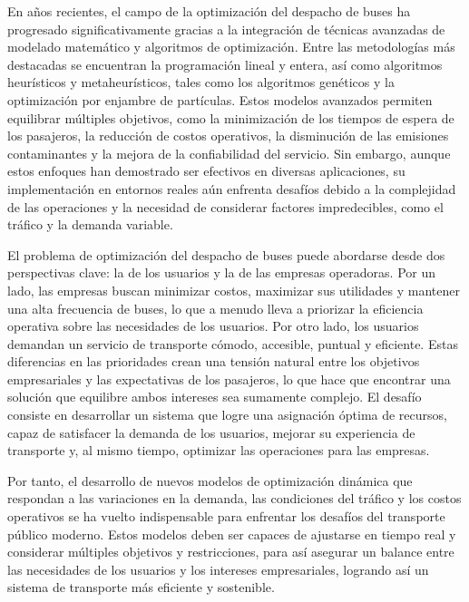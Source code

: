 \documentclass[preprint,11pt]{elsarticle}
\begin{document}
En años recientes, el campo de la optimización del despacho de buses ha progresado significativamente gracias a la integración de técnicas avanzadas de modelado matemático y algoritmos de optimización. Entre las metodologías más destacadas se encuentran la programación lineal y entera, así como algoritmos heurísticos y metaheurísticos, tales como los algoritmos genéticos y la optimización por enjambre de partículas. Estos modelos avanzados permiten equilibrar múltiples objetivos, como la minimización de los tiempos de espera de los pasajeros, la reducción de costos operativos, la disminución de las emisiones contaminantes y la mejora de la confiabilidad del servicio. Sin embargo, aunque estos enfoques han demostrado ser efectivos en diversas aplicaciones, su implementación en entornos reales aún enfrenta desafíos debido a la complejidad de las operaciones y la necesidad de considerar factores impredecibles, como el tráfico y la demanda variable. 

El problema de optimización del despacho de buses puede abordarse desde dos perspectivas clave: la de los usuarios y la de las empresas operadoras. Por un lado, las empresas buscan minimizar costos, maximizar sus utilidades y mantener una alta frecuencia de buses, lo que a menudo lleva a priorizar la eficiencia operativa sobre las necesidades de los usuarios. Por otro lado, los usuarios demandan un servicio de transporte cómodo, accesible, puntual y eficiente. Estas diferencias en las prioridades crean una tensión natural entre los objetivos empresariales y las expectativas de los pasajeros, lo que hace que encontrar una solución que equilibre ambos intereses sea sumamente complejo. El desafío consiste en desarrollar un sistema que logre una asignación óptima de recursos, capaz de satisfacer la demanda de los usuarios, mejorar su experiencia de transporte y, al mismo tiempo, optimizar las operaciones para las empresas. 

Por tanto, el desarrollo de nuevos modelos de optimización dinámica que respondan a las variaciones en la demanda, las condiciones del tráfico y los costos operativos se ha vuelto indispensable para enfrentar los desafíos del transporte público moderno. Estos modelos deben ser capaces de ajustarse en tiempo real y considerar múltiples objetivos y restricciones, para así asegurar un balance entre las necesidades de los usuarios y los intereses empresariales, logrando así un sistema de transporte más eficiente y sostenible. 

 

 
\end{document}
